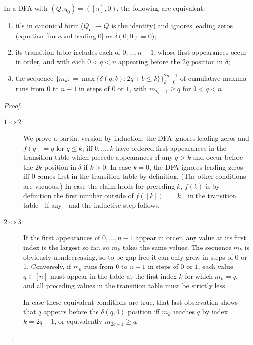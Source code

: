 \begin{lemma}\normalfont
  \label{far-dfa-canonical form}
  In a DFA with $(Q,q_0)=([n],0)$, the following are equivalent:
  \begin{enumerate}
    \item it's in canonical form ($Q_\textsf{cf}\to Q$ is the identity)
          and ignores leading zeros (equation \eqref{far-cond-leading-0} or $\delta(0,0)=0$);
    \item its transition table includes each of $0,\ldots,n-1$, whose first appearances occur in order,
          and with each $0 < q < n$ appearing before the $2q$ position in $\delta$;
    \item the sequence $\{m_k \mathrel{\mathop:}= \max\{\delta(q,b): 2q+b\le k\}\}_{k=0}^{2n-1}$ of cumulative maxima runs from $0$ to $n-1$ in steps of $0$ or $1$,
          with $m_{2q-1}\ge q$ for $0<q<n$.
  \end{enumerate}
\end{lemma}
\begin{proof}
\begin{description}
  \item[$1\iff 2$:]
        We prove a partial version by induction:
        the DFA ignores leading zeros and $f(q)=q$ for $q\le k$,
        iff $0,\ldots,k$ have ordered first appearances in the transition table
        which precede appearances of any $q>k$
        and occur before the $2k$ position in $\delta$ if $k>0$.
        In case $k=0$, the DFA ignores leading zeros iff $0$ comes first in the transition table by definition.
        (The other conditions are vacuous.)
        In case the claim holds for preceding $k$, $f(k)$ is by definition the first number outside of $f([k])=[k]$ in the transition table---if any---and the inductive step follows.
  \item[$2\iff 3$:]
        If the first appearances of $0,\ldots,n-1$ appear in order, any value at its first index is the largest so far, so $m_k$ takes the same values. The sequence $m_k$ is obviously nondecreasing, so to be gap-free it can only grow in steps of 0 or 1.
        Conversely, if $m_k$ runs from $0$ to $n-1$ in steps of $0$ or $1$, each value $q\in [n]$ must appear in the table at the first index $k$ for which $m_k=q$, and all preceding values in the transition table must be strictly less.

        In case these equivalent conditions are true, that last observation shows that $q$ appears before the $\delta(q,0)$ position iff $m_k$ reaches $q$ by index $k=2q-1$, or equivalently $m_{2q-1}\ge q$.
\end{description}
\end{proof}

